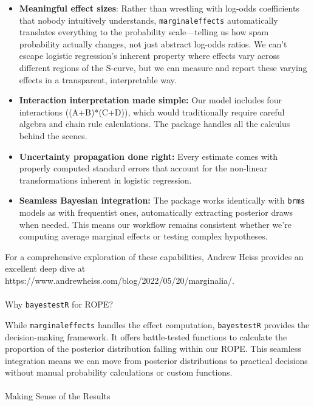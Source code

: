\documentclass[
  letterpaper,
  DIV=11,
  numbers=noendperiod]{scrartcl}
\makeatletter
\let\oldparagraph\paragraph
\renewcommand{\paragraph}{
    \@ifstar
      \xxxParagraphStar
      \xxxParagraphNoStar
  }
\newcommand{\xxxParagraphStar}[1]{\oldparagraph*{#1}\mbox{}}
\newcommand{\xxxParagraphNoStar}[1]{\oldparagraph{#1}\mbox{}}
\makeatother
\begin{document}
\begin{itemize}
\item
  \textbf{Meaningful effect sizes}: Rather than wrestling with log-odds
  coefficients that nobody intuitively understands,
  \texttt{marginaleffects} automatically translates everything to the
  probability scale---telling us how spam probability actually changes,
  not just abstract log-odds ratios. We can't escape logistic
  regression's inherent property where effects vary across different
  regions of the S-curve, but we can measure and report these varying
  effects in a transparent, interpretable way.
\item
  \textbf{Interaction interpretation made simple:} Our model includes
  four interactions ((A+B)*(C+D)), which would traditionally require
  careful algebra and chain rule calculations. The package handles all
  the calculus behind the scenes.
\item
  \textbf{Uncertainty propagation done right:} Every estimate comes with
  properly computed standard errors that account for the non-linear
  transformations inherent in logistic regression.
\item
  \textbf{Seamless Bayesian integration:} The package works identically
  with \texttt{brms} models as with frequentist ones, automatically
  extracting posterior draws when needed. This means our workflow
  remains consistent whether we're computing average marginal effects or
  testing complex hypotheses.
\end{itemize}

For a comprehensive exploration of these capabilities, Andrew Heiss
provides an excellent deep dive at
https://www.andrewheiss.com/blog/2022/05/20/marginalia/.

\paragraph{\texorpdfstring{Why \texttt{bayestestR} for
ROPE?}{Why bayestestR for ROPE?}}\label{why-bayestestr-for-rope}

While \texttt{marginaleffects} handles the effect computation,
\texttt{bayestestR} provides the decision-making framework. It offers
battle-tested functions to calculate the proportion of the posterior
distribution falling within our ROPE. This seamless integration means we
can move from posterior distributions to practical decisions without
manual probability calculations or custom functions.

\paragraph{Making Sense of the
Results}\label{making-sense-of-the-results}
\end{document}
